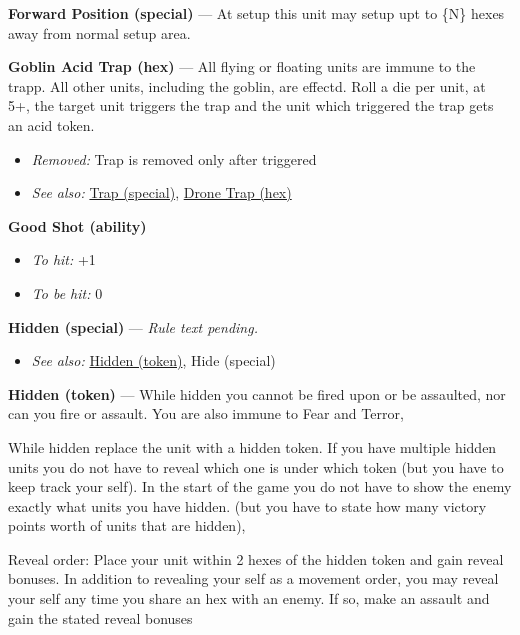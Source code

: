 \documentclass[a4paper,12pt]{article}
\begin{document}
\label{rule-special-forward-position}%
\noindent\textbf{Forward Position (special)} --- At setup this unit may setup upt to \{N\} hexes away from normal setup area.


\label{rule-hex-goblin-acid-trap}%
\noindent\textbf{Goblin Acid Trap (hex)} --- All flying or floating units are immune to the trapp. All other units, including the goblin, are effectd. Roll a die per unit, at 5+, the target unit triggers the trap and the unit which triggered the trap gets an acid token.
\begin{itemize}
\item \textit{Removed:} Trap is removed only after triggered
\item \textit{See also:} \hyperref[rule-special-trap]{Trap (special)}, \hyperref[rule-hex-drone-trap]{Drone Trap (hex)}
\end{itemize}


\label{rule-ability-good-shot}%
\noindent\textbf{Good Shot (ability)}\begin{itemize}
\item \textit{To hit:} +1
\item \textit{To be hit:} 0
\end{itemize}


\label{rule-special-hidden}%
\noindent\textbf{Hidden (special)} --- \textit{Rule text pending.}\begin{itemize}
\item \textit{See also:} \hyperref[rule-token-hidden]{Hidden (token)}, Hide (special)
\end{itemize}


\label{rule-token-hidden}%
\noindent\textbf{Hidden (token)} --- While hidden you cannot be fired upon or be assaulted, nor can you fire or assault. You are also immune to Fear and Terror,

While hidden replace the unit with a hidden token. If you have multiple hidden units you do not have to reveal which one is under which token (but you have to keep track your self). In the start of the game you do not have to show the enemy exactly what units you have hidden. (but you have to state how many victory points worth of units that are hidden),

Reveal order: Place your unit within 2 hexes of the hidden token and gain reveal bonuses. In addition to revealing your self as a movement order, you may reveal your self any time you share an hex with an enemy. If so, make an assault and gain the stated reveal bonuses
\end{document}
